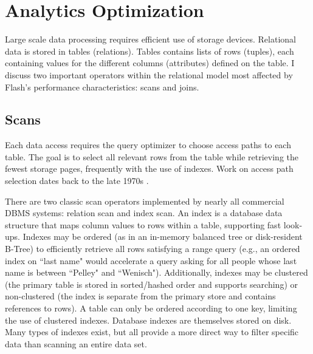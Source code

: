\section{Analytics Optimization}
\label{sec:Background:Analytics}

Large scale data processing requires efficient use of storage devices.
Relational data is stored in tables (relations).
Tables contains lists of rows (tuples), each containing values for the different columns (attributes) defined on the table.
I discuss two important operators within the relational model most affected by Flash's performance characteristics: scans and joins.

\subsection{Scans}
\label{sec:Background:Scans}

Each data access requires the query optimizer to choose access paths to each table. 
The goal is to select all relevant rows from the table while retrieving the fewest storage pages, frequently with the use of indexes.
Work on access path selection dates back to the late 1970s \cite{Selinger1979}.

There are two classic scan operators implemented by nearly all commercial DBMS systems: relation scan and index scan.
An index is a database data structure that maps column values to rows within a table, supporting fast look-ups.
Indexes may be ordered (as in an in-memory balanced tree or disk-resident B-Tree) to efficiently retrieve all rows satisfying a range query (e.g., an ordered index on ``last name" would accelerate a query asking for all people whose last name is between ``Pelley" and ``Wenisch").
Additionally, indexes may be clustered (the primary table is stored in sorted/hashed order and supports searching) or non-clustered (the index is separate from the primary store and contains references to rows).
A table can only be ordered according to one key, limiting the use of clustered indexes.
Database indexes are themselves stored on disk.
Many types of indexes exist, but all provide a more direct way to filter specific data than scanning an entire data set.

